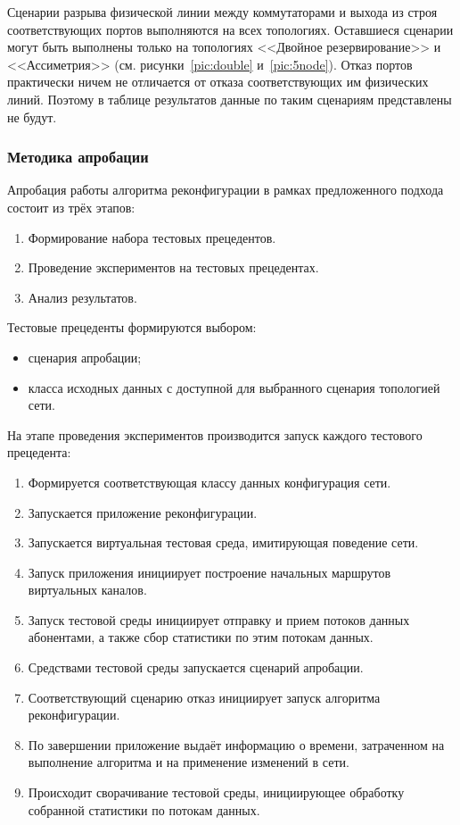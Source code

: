 \documentclass[12pt, a4paper]{article}
\begin{document}
Сценарии разрыва физической линии между коммутаторами и выхода из строя соответствующих портов выполняются на всех топологиях. Оставшиеся сценарии могут быть выполнены только на топологиях <<Двойное резервирование>> и <<Ассиметрия>> (см. рисунки~\ref{pic:double} и~\ref{pic:5node}). Отказ портов практически ничем не отличается от отказа соответствующих им физических линий. Поэтому в таблице результатов данные по таким сценариям представлены не будут.

\subsubsection{Методика апробации}
Апробация работы алгоритма реконфигурации в рамках предложенного подхода состоит из трёх этапов:
\begin{enumerate}
	\item Формирование набора тестовых прецедентов.
	\item Проведение экспериментов на тестовых прецедентах.
	\item Анализ результатов.
\end{enumerate}

Тестовые прецеденты формируются выбором:
\begin{itemize}
	\item сценария апробации;
	\item класса исходных данных с доступной для выбранного сценария топологией сети.
\end{itemize}

На этапе проведения экспериментов производится запуск каждого тестового прецедента:
\begin{enumerate}
	\item Формируется соответствующая классу данных конфигурация сети.
	\item Запускается приложение реконфигурации.
	\item Запускается виртуальная тестовая среда, имитирующая поведение сети.
	\item Запуск приложения инициирует построение начальных маршрутов виртуальных каналов.
	\item Запуск тестовой среды инициирует отправку и прием потоков данных абонентами, а также сбор статистики по этим потокам данных.
	\item Средствами тестовой среды запускается сценарий апробации.
	\item Соответствующий сценарию отказ инициирует запуск алгоритма реконфигурации.
	\item По завершении приложение выдаёт информацию о времени, затраченном на выполнение алгоритма и на применение изменений в сети.
	\item Происходит сворачивание тестовой среды, инициирующее обработку собранной статистики по потокам данных.
\end{enumerate}
\end{document}

